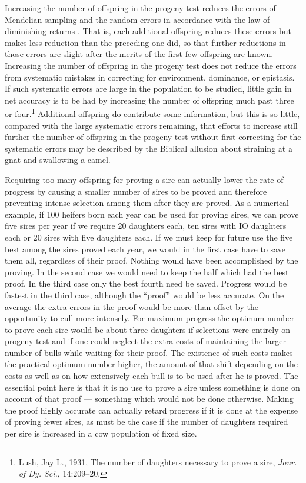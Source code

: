 Increasing the number of offspring in the progeny test reduces the
errors of Mendelian sampling and the random errors in accordance
with the law of diminishing returns . That is, each additional offspring
reduces these errors but makes less reduction than the preceding one
did, so that further reductions in those errors are slight after the merits
of the first few offspring are known. Increasing the number of offspring
in the progeny test does not reduce the errors from systematic mistakes
in correcting for environment, dominance, or epistasis. If such systematic
errors are large in the population to be studied, little gain in
net accuracy is to be had by increasing the number of offspring much
past three or four.\footnote{Lush, Jay L., 1931, The number of daughters
necessary to prove a sire, \textit{Jour. of Dy. Sci.}, 14:209--20.}
Additional offspring do contribute some information,
but this is so little, compared with the large systematic errors
remaining, that efforts to increase still further the number of offspring
in the progeny test without first correcting for the systematic errors may
be described by the Biblical allusion about straining at a gnat and swallowing
a camel.

Requiring too many offspring for proving a sire can actually lower
the rate of progress by causing a smaller number of sires to be proved
and therefore preventing intense selection among them after they are
proved. As a numerical example, if 100 heifers born each year can be
used for proving sires, we can prove five sires per year if we require 20
daughters each, ten sires with IO daughters each or 20 sires with five
daughters each. If we must keep for future use the five best among the
sires proved each year, we would in the first case have to save them all,
regardless of their proof. Nothing would have been accomplished by the
proving. In the second case we would need to keep the half which had
the best proof. In the third case only the best fourth need be saved.
Progress would be fastest in the third case, although the ``proof'' would
be less accurate. On the average the extra errors in the proof would be
more than offset by the opportunity to cull more intensely. For maximum
progress the optimum number to prove each sire would be about
three daughters if selections were entirely on progeny test and if one
could neglect the extra costs of maintaining the larger number of bulls
while waiting for their proof. The existence of such costs makes the
practical optimum number higher, the amount of that shift depending
on the costs as well as on how extensively each bull is to be used after he
is proved. The essential point here is that it is no use to prove a sire
unless something is done on account of that proof --- something which
would not be done otherwise. Making the proof highly accurate can
actually retard progress if it is done at the expense of proving fewer
sires, as must be the case if the number of daughters required per sire is
increased in a cow population of fixed size.

